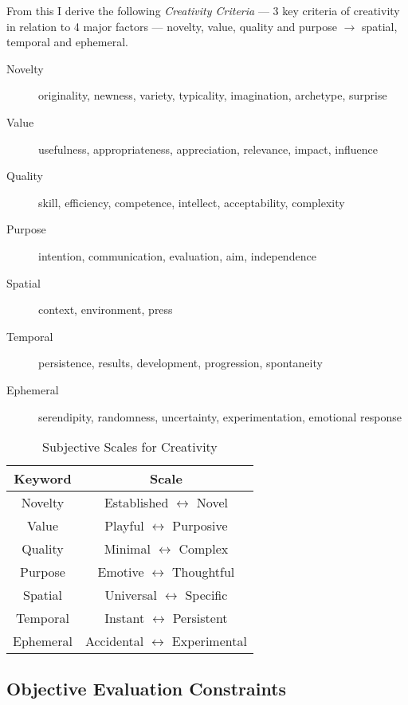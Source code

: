 From this I derive the following \hypertarget{creadef}{\textit{Creativity Criteria}} --- 3 key criteria of creativity in relation to 4 major factors --- novelty, value, quality and purpose $\to$ spatial, temporal and ephemeral.

\begin{description}
  \item [Novelty] originality, newness, variety, typicality, imagination, archetype, surprise
  \item [Value] usefulness, appropriateness, appreciation, relevance, impact, influence
  \item [Quality] skill, efficiency, competence, intellect, acceptability, complexity
  \item [Purpose] intention, communication, evaluation, aim, independence
  \item [Spatial] context, environment, press
  \item [Temporal] persistence, results, development, progression, spontaneity
  \item [Ephemeral] serendipity, randomness, uncertainty, experimentation, emotional response
\end{description}


\begin{table}
\centering
  \begin{tabu}{cc}
  \toprule
  \textbf{Keyword} & \textbf{Scale} \\
  \midrule
  Novelty & Established $\leftrightarrow$ Novel \\
  Value & Playful $\leftrightarrow$ Purposive \\
  Quality & Minimal $\leftrightarrow$ Complex \\
  Purpose & Emotive $\leftrightarrow$ Thoughtful \\
  Spatial & Universal $\leftrightarrow$ Specific \\
  Temporal & Instant $\leftrightarrow$ Persistent \\
  Ephemeral & Accidental $\leftrightarrow$ Experimental \\
  \bottomrule
  \end{tabu}
\caption[Subjective Scales for Creativity]{Subjective Scales for Creativity}
\label{table_subcreat}
\end{table}


\subsection{Objective Evaluation Constraints}

